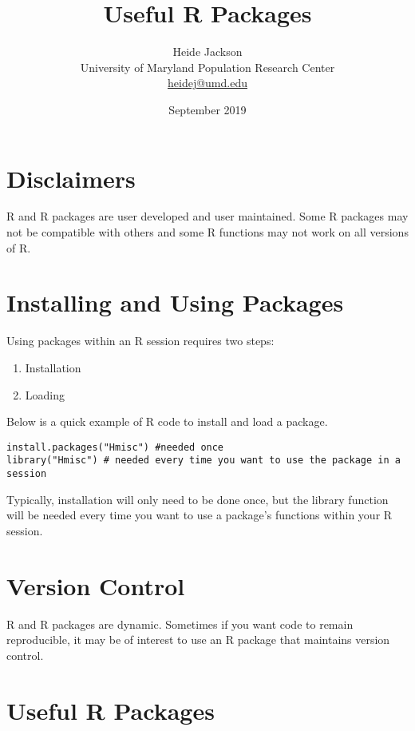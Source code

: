 \documentclass{report}
\title{Useful R Packages}
\author{Heide Jackson 
\\University of Maryland Population Research Center\\ \url{heidej@umd.edu}}
\date{September 2019}
\begin{document}
\maketitle
\tableofcontents
\pagebreak
\section*{Disclaimers}
R and R packages are user developed and user maintained.  Some R packages may not be compatible with others and some R functions may not work on all versions of R.  

\section{Installing and Using Packages}
Using packages within an R session requires two steps:
\begin{enumerate}
    \item Installation 
    \item Loading
\end{enumerate}
Below is a quick example of R code to install and load a package.
\begin{verbatim}
install.packages("Hmisc") #needed once
library("Hmisc") # needed every time you want to use the package in a session
\end{verbatim}
Typically, installation will only need to be done once, but the library function will be needed every time you want to use a package's functions within your R session.
\section{Version Control}
R and R packages are dynamic. Sometimes if you want code to remain reproducible, it may be of interest to use an R package that maintains version control. 

\pagebreak
\section{Useful R Packages}
\end{document}
